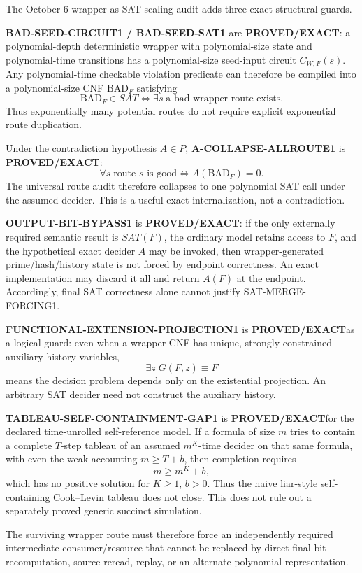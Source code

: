 \documentclass[11pt]{article}
\newcommand{\statusproved}{\textcolor{proved}{\textbf{PROVED/EXACT}}}
\theoremstyle{plain}
\theoremstyle{definition}
\theoremstyle{remark}
\begin{document}
The October 6 wrapper-as-SAT scaling audit adds three exact structural guards.

\textbf{BAD-SEED-CIRCUIT1 / BAD-SEED-SAT1} are \statusproved: a
polynomial-depth deterministic wrapper with polynomial-size state and
polynomial-time transitions has a polynomial-size seed-input circuit
\(C_{W,F}(s)\).  Any polynomial-time checkable violation predicate can therefore
be compiled into a polynomial-size CNF \(\mathrm{BAD}_F\) satisfying
\[
\mathrm{BAD}_F\in SAT
\iff
\exists s\;\text{a bad wrapper route exists}.
\]
Thus exponentially many potential routes do not require explicit exponential
route duplication.

Under the contradiction hypothesis \(A\in P\),
\textbf{A-COLLAPSE-ALLROUTE1} is \statusproved:
\[
\forall s\;\text{route }s\text{ is good}
\iff
A(\mathrm{BAD}_F)=0.
\]
The universal route audit therefore collapses to one polynomial SAT call under
the assumed decider.  This is a useful exact internalization, not a
contradiction.

\textbf{OUTPUT-BIT-BYPASS1} is \statusproved: if the only externally required
semantic result is \(SAT(F)\), the ordinary model retains access to \(F\), and
the hypothetical exact decider \(A\) may be invoked, then wrapper-generated
prime/hash/history state is not forced by endpoint correctness.  An exact
implementation may discard it all and return \(A(F)\) at the endpoint.
Accordingly, final SAT correctness alone cannot justify SAT-MERGE-FORCING1.

\textbf{FUNCTIONAL-EXTENSION-PROJECTION1} is \statusproved as a logical guard:
even when a wrapper CNF has unique, strongly constrained auxiliary history
variables,
\[
\exists z\;G(F,z)\equiv F
\]
means the decision problem depends only on the existential projection.  An
arbitrary SAT decider need not construct the auxiliary history.

\textbf{TABLEAU-SELF-CONTAINMENT-GAP1} is \statusproved for the declared
time-unrolled self-reference model.  If a formula of size \(m\) tries to
contain a complete \(T\)-step tableau of an assumed \(m^K\)-time decider on
that same formula, with even the weak accounting \(m\ge T+b\), then completion
requires
\[
m\ge m^K+b,
\]
which has no positive solution for \(K\ge1\), \(b>0\).  Thus the naive
liar-style self-containing Cook--Levin tableau does not close.  This does not
rule out a separately proved generic succinct simulation.

The surviving wrapper route must therefore force an independently required
intermediate consumer/resource that cannot be replaced by direct final-bit
recomputation, source reread, replay, or an alternate polynomial
representation.
\end{document}
